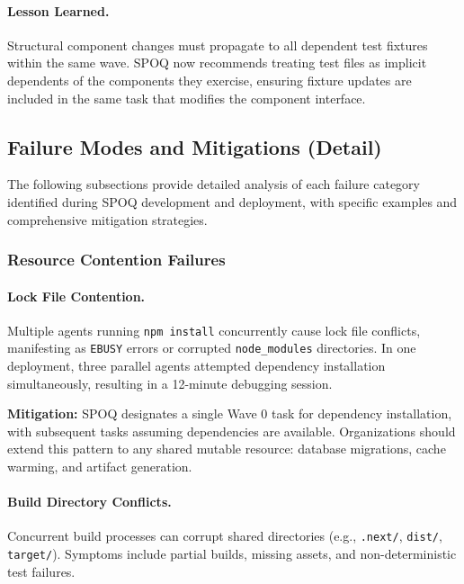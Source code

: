\paragraph{Lesson Learned.}
Structural component changes must propagate to all dependent test fixtures
within the same wave. SPOQ now recommends treating test files as implicit
dependents of the components they exercise, ensuring fixture updates are
included in the same task that modifies the component interface.

\subsection{Failure Modes and Mitigations (Detail)}
\label{subsec:failure-modes-detail}

The following subsections provide detailed analysis of each failure category
identified during SPOQ development and deployment, with specific examples
and comprehensive mitigation strategies.

\subsubsection{Resource Contention Failures}
\label{subsubsec:resource-contention-detail}

\paragraph{Lock File Contention.}
Multiple agents running \texttt{npm install} concurrently cause lock file
conflicts, manifesting as \texttt{EBUSY} errors or corrupted \texttt{node\_modules}
directories. In one deployment, three parallel agents attempted dependency
installation simultaneously, resulting in a 12-minute debugging session.

\textbf{Mitigation:} SPOQ designates a single Wave 0 task for dependency
installation, with subsequent tasks assuming dependencies are available.
Organizations should extend this pattern to any shared mutable resource:
database migrations, cache warming, and artifact generation.

\paragraph{Build Directory Conflicts.}
Concurrent build processes can corrupt shared directories (e.g., \texttt{.next/},
\texttt{dist/}, \texttt{target/}). Symptoms include partial builds, missing
assets, and non-deterministic test failures.

